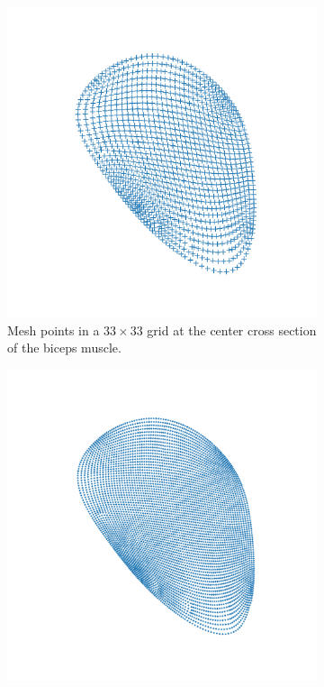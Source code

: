 \begin{figure}[H]
  \centering%
  \begin{subfigure}[t]{0.48\textwidth}%
    \centering%
    \includegraphics[width=\textwidth]{images/parallel_fiber_estimation/left_biceps_brachii_33x33fibers_bin_csv.pdf}%
    \caption{Mesh points in a $33\times 33$ grid at the center cross section of the biceps muscle.}%
    \label{fig:left_biceps_brachii_33x33fibers_bin_csv}%
  \end{subfigure}
  \quad
  \begin{subfigure}[t]{0.48\textwidth}%
    \centering%
    \includegraphics[width=\textwidth]{images/parallel_fiber_estimation/left_biceps_brachii_71x71fibers_bin_csv.pdf} %

\end{subfigure}
\end{figure}
